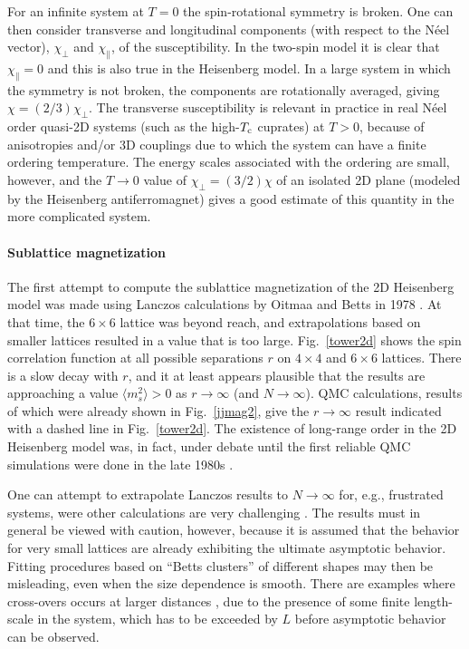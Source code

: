 \documentclass[draft,numberedheadings]{aipproc}
\begin{document}
For an infinite system at $T=0$ the spin-rotational symmetry is broken. One can then consider transverse and longitudinal components (with 
respect to the N\'eel vector), $\chi_\perp$ and $\chi_\parallel$, of the susceptibility. In the two-spin model it is clear that $\chi_\parallel=0$
and this is also true in the Heisenberg model. In a large system in which the symmetry is not broken, the components are rotationally averaged,
giving $\chi=(2/3)\chi_\perp$. The transverse susceptibility is relevant in practice in real N\'eel order quasi-2D systems (such as the 
high-$T_{\rm c}$ cuprates) at $T>0$, because of anisotropies and/or 3D couplings due to which the system can have a finite ordering temperature. 
The energy scales associated with the ordering are small, however, and the $T\to 0$ value of $\chi_\perp=(3/2)\chi$ of an isolated 2D
plane (modeled by the Heisenberg antiferromagnet) gives a good estimate of this quantity in the more complicated system.

\paragraph{Sublattice magnetization}

The first attempt to compute the sublattice magnetization of the 2D Heisenberg model was made using Lanczos calculations by Oitmaa and Betts
in 1978 \cite{oitmaa78}. At that time, the $6\times 6$ lattice was beyond reach, and extrapolations based on smaller lattices resulted in a value that 
is too large. Fig.~\ref{tower2d} shows the spin correlation function at all possible separations $r$ on $4\times 4$ and $6\times 6$ lattices. There 
is a slow decay with $r$, and it at least appears plausible that the results are approaching a value $\langle m_s^2\rangle >0$ as $r \to \infty$ 
(and $N \to \infty$). QMC calculations, results of which were already shown in Fig.~\ref{jjmag2}, give the $r\to \infty$ result indicated with
a dashed line in Fig.~\ref{tower2d}. The existence of long-range order in the 2D Heisenberg model was, in fact, under debate until the
first reliable QMC simulations were done in the late 1980s \cite{reger}.

One can attempt to extrapolate Lanczos results to $N\to \infty$ for, e.g., frustrated systems, were other calculations are very challenging 
\cite{dagotto3,schulz1}. The results must in general be viewed with caution, however, because it is assumed that the behavior for very small lattices are 
already exhibiting the ultimate asymptotic behavior. Fitting procedures based on  ``Betts clusters'' \cite{bettsclusters} of different shapes may then be 
misleading, even when the size dependence is smooth. There are examples where cross-overs occurs at larger distances \cite{mchains}, due to the presence
of some finite length-scale in the system, which has to be exceeded by $L$ before asymptotic behavior can be observed. 
\end{document}
